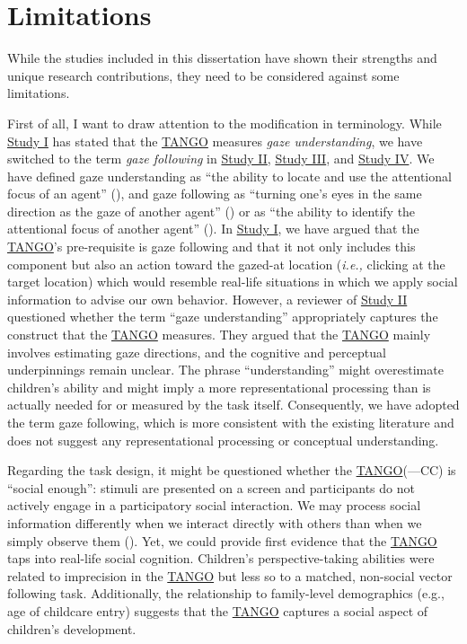 \documentclass[
]{scrbook}
\begin{document}
\section{Limitations}\label{limitations}

While the studies included in this dissertation have shown their strengths and unique research contributions, they need to be considered against some limitations.

First of all, I want to draw attention to the modification in terminology. While \hyperref[studyI]{Study I} has stated that the \hyperref[acronyms_TANGO]{TANGO} measures \emph{gaze understanding}, we have switched to the term \emph{gaze following} in \hyperref[studyII]{Study II}, \hyperref[studyIII]{Study III}, and \hyperref[studyIV]{Study IV}. We have defined gaze understanding as ``the ability to locate and use the attentional focus of an agent'' (), and gaze following as ``turning one's eyes in the same direction as the gaze of another agent'' () or as ``the ability to identify the attentional focus of another agent'' (). In \hyperref[studyI]{Study I}, we have argued that the \hyperref[acronyms_TANGO]{TANGO}'s pre-requisite is gaze following and that it not only includes this component but also an action toward the gazed-at location (\emph{i.e.,} clicking at the target location) which would resemble real-life situations in which we apply social information to advise our own behavior. However, a reviewer of \hyperref[studyII]{Study II} questioned whether the term ``gaze understanding'' appropriately captures the construct that the \hyperref[acronyms_TANGO]{TANGO} measures. They argued that the \hyperref[acronyms_TANGO]{TANGO} mainly involves estimating gaze directions, and the cognitive and perceptual underpinnings remain unclear. The phrase ``understanding'' might overestimate children's ability and might imply a more representational processing than is actually needed for or measured by the task itself. Consequently, we have adopted the term gaze following, which is more consistent with the existing literature and does not suggest any representational processing or conceptual understanding.

Regarding the task design, it might be questioned whether the \hyperref[acronyms_TANGO]{TANGO}(---CC) is ``social enough'': stimuli are presented on a screen and participants do not actively engage in a participatory social interaction. We may process social information differently when we interact directly with others than when we simply observe them (). Yet, we could provide first evidence that the \hyperref[acronyms_TANGO]{TANGO} taps into real-life social cognition. Children's perspective-taking abilities were related to imprecision in the \hyperref[acronyms_TANGO]{TANGO} but less so to a matched, non-social vector following task. Additionally, the relationship to family-level demographics (e.g., age of childcare entry) suggests that the \hyperref[acronyms_TANGO]{TANGO} captures a social aspect of children's development.
\end{document}
